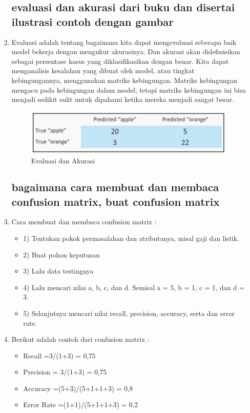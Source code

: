 \begin{enumerate}
\subsection{evaluasi dan akurasi dari buku dan disertai ilustrasi contoh
dengan gambar}

\item Evaluasi adalah tentang bagaimana kita dapat mengevaluasi seberapa baik model bekerja dengan mengukur akurasinya. Dan akurasi akan didefinisikan sebagai persentase kasus yang diklasifikasikan dengan benar. Kita dapat menganalisis kesalahan yang dibuat oleh model, atau tingkat kebingungannya, menggunakan matriks kebingungan. Matriks kebingungan mengacu pada kebingungan dalam model, tetapi matriks kebingungan ini bisa menjadi sedikit sulit untuk dipahami ketika mereka menjadi sangat besar.

\begin{figure}[ht]
\centering
\includegraphics[scale=0.5]{figures/f9.jpg}
\caption{ Evaluasi dan Akurasi}
\label{contoh}
\end{figure}

\subsection{ bagaimana cara membuat dan membaca confusion matrix, buat confusion matrix }

\item Cara membuat dan membaca confusion matrix :
\begin{itemize}
\item 1) Tentukan pokok permasalahan dan atributanya, misal gaji dan listik.
\item 2) Buat pohon keputusan
\item 3) Lalu data testingnya
\item 4) Lalu mencari nilai a, b, c, dan d. Semisal a = 5, b = 1, c = 1, dan d = 3.
\item 5) Selanjutnya mencari nilai recall, precision, accuracy, serta dan error rate.
\end{itemize}
\item Berikut adalah contoh dari confusion matrix :
\begin{itemize}
\item Recall =3/(1+3) = 0,75
\item Precision = 3/(1+3) = 0,75
\item Accuracy =(5+3)/(5+1+1+3) = 0,8
\item Error Rate =(1+1)/(5+1+1+3) = 0,2
\end{itemize}


\end{enumerate}
